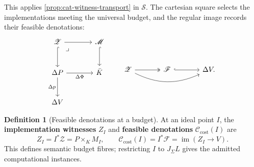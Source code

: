 \documentclass[11pt,a4paper]{article}
\numberwithin{algorithm}{section}
\numberwithin{equation}{section}
\theoremstyle{definition}
\newtheorem{definition}[definition]{Definition}
\theoremstyle{remark}
\theoremstyle{plain}
\newcommand{\J}{J_{\Sigma}}
\newcommand{\im}{\operatorname{im}}
\newcommand{\CostClass}{\mathcal C_{\mathrm{cost}}}
\theoremstyle{definition}
\theoremstyle{plain}
\begin{document}
This applies \cref{prop:cat-witness-transport} in $\mathscr S$.
The cartesian square selects the implementations meeting the
universal budget, and the regular image records their feasible
denotations:
\begin{equation}\label{eq:cat-universal-incidence-square}
\begin{tikzcd}[column sep=large,row sep=large]
 \mathscr Z \arrow[dr,phantom,"\lrcorner",very near start] \arrow[r] \arrow[d,hook]
   & \mathscr M \arrow[d,hook]\\
 \Delta P \arrow[r,"{\Delta\Phi}"'] \arrow[d,"{\Delta p}"']
   & \bar K\\
 \Delta V &
\end{tikzcd}
\qquad
\begin{tikzcd}[column sep=large]
 \mathscr Z \arrow[r,two heads] \arrow[rr,bend right=25]
   & \mathscr F \arrow[r,hook] & \Delta V .
\end{tikzcd}
\end{equation}


\begin{definition}[Feasible denotations at a budget]\label{def:budget-feasibility}
At an ideal point $I$, the \textbf{implementation witnesses} $Z_I$
and \textbf{feasible denotations} $\CostClass(I)$ are
\begin{equation}\label{eq:incidence}
 Z_I=I^*\mathscr Z=P\times_KM_I,\qquad
 \CostClass(I)=I^*\mathscr F=\im(Z_I\to V).
\end{equation}
This defines semantic budget fibres; restricting $I$ to $\J L$
gives the admitted computational instances.
\end{definition}
\end{document}
